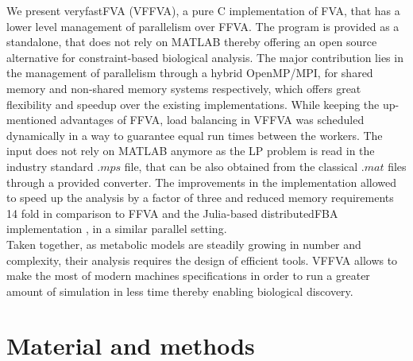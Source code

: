 We present veryfastFVA (VFFVA), a pure C implementation of FVA, that has a lower level management of parallelism over FFVA. The program is provided as a standalone, that does not rely on MATLAB thereby offering an open source alternative for constraint-based biological analysis. The major contribution lies in the management of parallelism through a hybrid OpenMP/MPI, for shared memory and non-shared memory systems respectively, which offers great flexibility and speedup over the existing implementations. While keeping the up-mentioned advantages of FFVA, load balancing in VFFVA was scheduled dynamically \cite{suss2008common} in a way to guarantee equal run times between the workers. The input does not rely on MATLAB anymore as the LP problem is read in the industry standard $.mps$ file, that can be also obtained from the classical $.mat$ files through a provided converter. The improvements in the implementation allowed to speed up the analysis by a factor of three  and reduced memory requirements 14 fold in comparison to FFVA and the Julia-based distributedFBA implementation \cite{heirendt2016distributedfba}, in a similar parallel setting.\\
Taken together, as metabolic models are steadily growing in number and complexity, their analysis requires the design of efficient tools. VFFVA allows to make the most of modern machines specifications in order to run a greater amount of simulation in less time thereby enabling biological discovery. 
\section{Material and methods}
